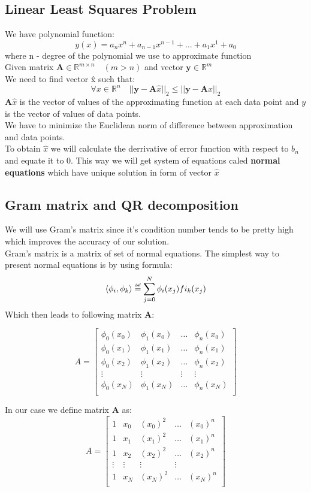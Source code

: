 \documentclass[12pt]{report}
\newcommand\myeq{\mathrel{\overset{\makebox[0pt]{\mbox{\normalfont\tiny\sffamily def}}}{=}}}
\begin{document}
\subsection{Linear Least Squares Problem}
We have polynomial function:
\[ y(x) = a_nx^n + a_{n-1}x^{n-1} + \dots + a_1x^1 + a_0 \]
where n - degree of the polynomial we use to approximate function \\
Given matrix $\mathbf{A} \in \mathbb{R}^{m \times n} \quad (m > n)$ and vector $\mathbf{y} \in \mathbb{R}^m$ \\
We need to find vector \^{x} such that:
\[ 	\forall x \in \mathbb{R}^n \quad|| \mathbf{y} - \mathbf{A} \hat{x} ||_2 \leq || \mathbf{y} - \mathbf{A}x ||_2  \]
$\mathbf{A}\hat{x}$ is the vector of values of the approximating function at each data point and $y$ is the vector of values of data points. \\
We have to minimize the Euclidean norm of difference between approximation and data points. \\
To obtain $\hat{x}$ we will calculate the derrivative of error function with respect to $b_n$ and equate it to 0. This way we will get system of equations caled \textbf{normal equations} which have unique solution in form of vector $\hat{x}$

\subsection{Gram matrix and QR decomposition}
We will use Gram's matrix since it's condition number tends to be pretty high which improves the accuracy of our solution. \\
Gram's matrix is a matrix of set of normal equations. The simplest way to present normal equations is by using formula:
\[ \langle \phi_i, \phi_k \rangle \myeq \sum_{j=0}^N \phi_i(x_j)fi_k(x_j) \]
Which then leads to following matrix \textbf{A}:

\[
A = \begin{bmatrix}
\phi_0(x_0) & \phi_1(x_0) &  \dots & \phi_n(x_0) \\
\phi_0(x_1) & \phi_1(x_1) & \dots & \phi_n(x_1) \\
\phi_0(x_2) & \phi_1(x_2) & \dots & \phi_n(x_2) \\
\vdots & \vdots & \vdots & \vdots \\
\phi_0(x_N) & \phi_1(x_N) & \dots & \phi_n(x_N) \\
\end{bmatrix}
\]

In our case we define matrix \textbf{A} as:
\[
A = \begin{bmatrix}
1 & x_0 & (x_0)^2  & \dots & (x_0)^n \\
1 & x_1 & (x_1)^2 &  \dots & (x_1)^n\\
1 & x_2 & (x_2)^2 &  \dots & (x_2)^n\\
\vdots & \vdots & \vdots & \vdots \\
1 & x_N & (x_N)^2 &  \dots & (x_N)^n\\
\end{bmatrix}
\]
\end{document}
